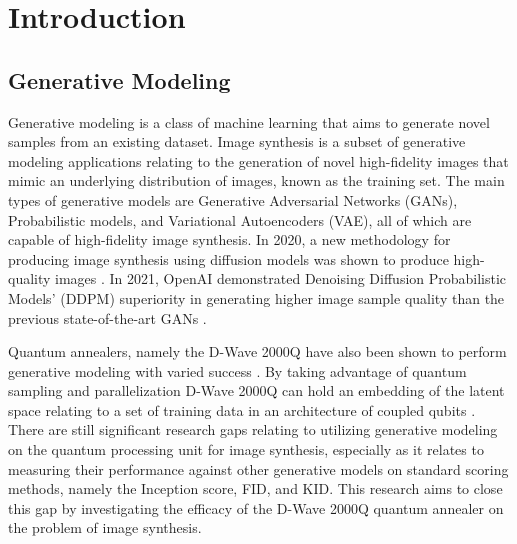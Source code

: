 \documentclass[technologies,article,accept,pdftex,moreauthors]{Definitions/mdpi}
\begin{document}
 
\section{Introduction}
\subsection{Generative Modeling}
 
Generative modeling is a class of machine learning that aims to generate novel samples from an existing dataset. Image synthesis is a subset of generative modeling applications relating to the generation of novel high-fidelity images that mimic an underlying distribution of images, known as the training set. The main types of generative models are Generative Adversarial Networks (GANs), Probabilistic models, and Variational Autoencoders (VAE), all of which are capable of high-fidelity image synthesis. In 2020, a new methodology for producing image synthesis using diffusion models was shown to produce high-quality images \cite{ho2020denoising}. In 2021, OpenAI demonstrated Denoising Diffusion Probabilistic Models' (DDPM) superiority in generating higher image sample quality than the previous state-of-the-art GANs \cite{dhariwal2021diffusion}.   %

Quantum annealers, namely the D-Wave 2000Q have also been shown to perform generative modeling with varied success \cite{Jain2020}\cite{Thulasidasan2016}. By taking advantage of quantum sampling and parallelization D-Wave 2000Q can hold an embedding of the latent space relating to a set of training data in an architecture of coupled qubits \cite{Amin_2018}. There are still significant research gaps relating to utilizing generative modeling on the quantum processing unit for image synthesis, especially as it relates to measuring their performance against other generative models on standard scoring methods, namely the Inception score, FID, and KID. This research aims to close this gap by investigating the efficacy of the D-Wave 2000Q quantum annealer on the problem of image synthesis.
\end{document}
